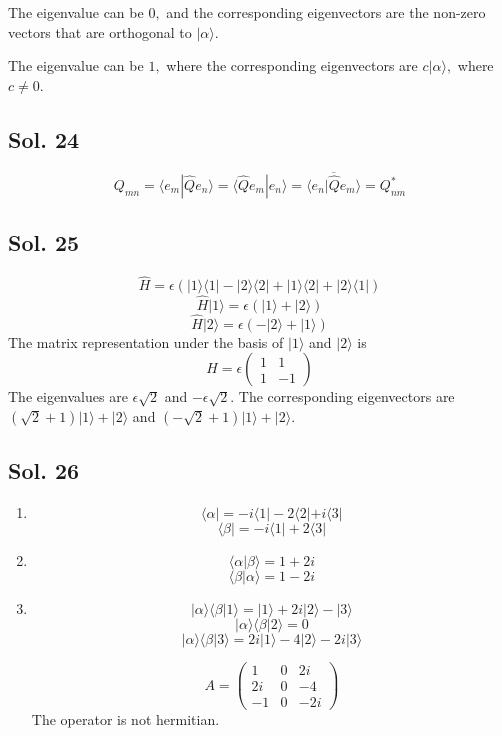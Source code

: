 The eigenvalue can be $0,$ and the corresponding eigenvectors are the non-zero vectors that are orthogonal to $|\alpha\rangle.$

The eigenvalue can be $1,$ where the corresponding eigenvectors are $c|\alpha\rangle,$ where $c\neq0.$

\subsection*{Sol. 24}
$$
Q_{mn}=\langle e_m|\hat{Q}e_n\rangle
=\langle \hat{Q}e_m|e_n\rangle
=\overline{\langle e_n|\hat{Q}e_m\rangle}
=Q_{nm}^*
$$

\subsection*{Sol. 25}
$$
\hat{H}
=
\epsilon(
|1\rangle\langle1|
-
|2\rangle\langle2|
+|1\rangle\langle2|
+|2\rangle\langle1|
)
$$
$$
\hat{H}| 1\rangle
=\epsilon(|1\rangle+|2\rangle)
$$
$$
\hat{H}| 2\rangle
=\epsilon(-|2\rangle+|1\rangle)
$$
The matrix representation under the basis of $|1\rangle$ and $|2\rangle$ is 
$$
H = \epsilon\begin{pmatrix}
1 & 1\\
1 & -1
\end{pmatrix}
$$
The eigenvalues are $\epsilon\sqrt{2}$ and $-\epsilon\sqrt{2}.$
The corresponding eigenvectors are $(\sqrt{2}+1)|1\rangle + |2\rangle$ and $(-\sqrt{2}+1)|1\rangle + |2\rangle.$

\subsection*{Sol. 26}
\begin{enumerate}
    \item 
    $$
    \langle\alpha| = 
    -i\langle1|
    -2\langle2|
    +i\langle3|
    $$
    $$
    \langle\beta| = 
    -i\langle1|
    +2\langle3|
    $$
    \item 
    $$
    \langle\alpha|\beta\rangle
    =1+2i
    $$
    $$
    \langle\beta|\alpha\rangle
    =1-2i
    $$
    \item 
    $$
    |\alpha\rangle\langle\beta| 1\rangle
    =|1\rangle + 2i|2\rangle -|3\rangle
    $$
    $$
    |\alpha\rangle\langle\beta| 2\rangle
    =0
    $$
    $$
    |\alpha\rangle\langle\beta| 3\rangle
    =2i|1\rangle-4|2\rangle-2i|3\rangle
    $$
    
    $$
    A = 
    \begin{pmatrix}
        1 & 0 & 2i\\
        2i & 0 & -4 \\
        -1 & 0 & -2i
    \end{pmatrix}
    $$
    The operator is not hermitian.
    
\end{enumerate}

